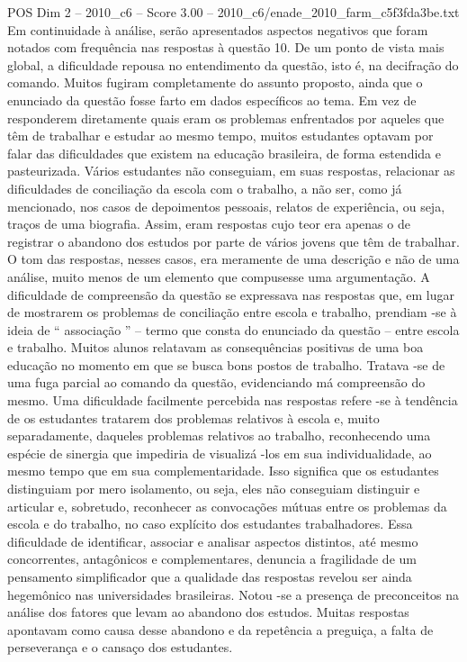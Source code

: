 \begin{textsample}{POS Dim 2 – 2010\_c6 – Score 3.00 – 2010\_c6/enade\_2010\_farm\_c5f3fda3be.txt}
Em continuidade à análise, serão apresentados aspectos negativos que foram notados com frequência nas respostas à questão 10.
De um ponto de vista mais global, a dificuldade repousa no entendimento da questão, isto é, na decifração do comando.
Muitos fugiram completamente do assunto proposto, ainda que o enunciado da questão fosse farto em dados específicos ao tema.
Em vez de responderem diretamente quais eram os problemas enfrentados por aqueles que têm de trabalhar e estudar ao mesmo tempo, muitos estudantes optavam por falar das dificuldades que existem na educação brasileira, de forma estendida e pasteurizada.
Vários estudantes não conseguiam, em suas respostas, relacionar as dificuldades de conciliação da escola com o trabalho, a não ser, como já mencionado, nos casos de depoimentos pessoais, relatos de experiência, ou seja, traços de uma biografia.
Assim, eram respostas cujo teor era apenas o de registrar o abandono dos estudos por parte de vários jovens que têm de trabalhar.
O tom das respostas, nesses casos, era meramente de uma descrição e não de uma análise, muito menos de um elemento que compusesse uma argumentação.
A dificuldade de compreensão da questão se expressava nas respostas que, em lugar de mostrarem os problemas de conciliação entre escola e trabalho, prendiam -se à ideia de “ associação ” – termo que consta do enunciado da questão – entre escola e trabalho.
Muitos alunos relatavam as consequências positivas de uma boa educação no momento em que se busca bons postos de trabalho.
Tratava -se de uma fuga parcial ao comando da questão, evidenciando má compreensão do mesmo.
Uma dificuldade facilmente percebida nas respostas refere -se à tendência de os estudantes tratarem dos problemas relativos à escola e, muito separadamente, daqueles problemas relativos ao trabalho, reconhecendo uma espécie de sinergia que impediria de visualizá -los em sua individualidade, ao mesmo tempo que em sua complementaridade.
Isso significa que os estudantes distinguiam por mero isolamento, ou seja, eles não conseguiam distinguir e articular e, sobretudo, reconhecer as convocações mútuas entre os problemas da escola e do trabalho, no caso explícito dos estudantes trabalhadores.
Essa dificuldade de identificar, associar e analisar aspectos distintos, até mesmo concorrentes, antagônicos e complementares, denuncia a fragilidade de um pensamento simplificador que a qualidade das respostas revelou ser ainda hegemônico nas universidades brasileiras.
Notou -se a presença de preconceitos na análise dos fatores que levam ao abandono dos estudos.
Muitas respostas apontavam como causa desse abandono e da repetência a preguiça, a falta de perseverança e o cansaço dos estudantes.

\end{textsample}

